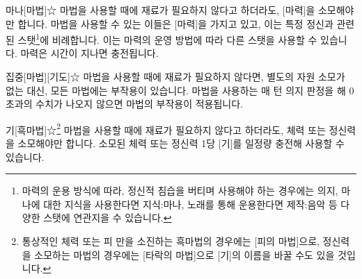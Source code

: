 \documentclass{report}
\begin{document}
	\begin{story}{마나}{[마법]☆}
		마법을 사용할 때에 재료가 필요하지 않다고 하더라도, [마력]을 소모해야만 합니다. 마법을 사용할 수 있는 이들은 [마력]을 가지고 있고, 이는 특정 정신과 관련된 스탯\footnote{마력의 운용 방식에 따라, 정신적 침습을 버티며 사용해야 하는 경우에는 의지, 마나에 대한 지식을 사용한다면 지식:마나, 노래를 통해 운용한다면 제작:음악 등 다양한 스탯에 연관지을 수 있습니다.}에 비례합니다. 이는 마력의 운영 방법에 따라 다른 스탯을 사용할 수 있습니다. 마력은 시간이 지나면 충전됩니다.
	\end{story}

	\begin{story}{집중}{[마법][기도]☆}
		마법을 사용할 때에 재료가 필요하지 않다면, 별도의 자원 소모가 없는 대신, 모든 마법에는 부작용이 있습니다. 마법을 사용하는 매 턴 의지 판정을 해 0 초과의 수치가 나오지 않으면 마법의 부작용이 적용됩니다.
	\end{story}
	
	\begin{story}{기}{[흑마법]☆\footnote{통상적인 체력 또는 피 만을 소진하는 흑마법의 경우에는 [피의 마법]으로, 정신력을 소모하는 마법의 경우에는 [타락의 마법]으로 [기]의 이름을 바꿀 수도 있을 것입니다.}}
		마법을 사용할 때에 재료가 필요하지 않다고 하더라도, 체력 또는 정신력을 소모해야만 합니다. 소모된 체력 또는 정신력 1당 [기]를 일정량 충전해 사용할 수 있습니다.
	\end{story}
\end{document}
